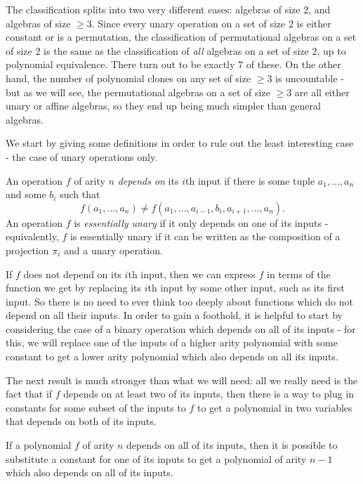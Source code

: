 \begin{appendices}
The classification splits into two very different cases: algebras of size $2$, and algebras of size $\ge 3$. Since every unary operation on a set of size $2$ is either constant or is a permutation, the classification of permutational algebras on a set of size $2$ is the same as the classification of \emph{all} algebras on a set of size $2$, up to polynomial equivalence. There turn out to be exactly $7$ of these. On the other hand, the number of polynomial clones on any set of size $\ge 3$ is uncountable \cite{uncountable-polynomial-clones} - but as we will see, the permutational algebras on a set of size $\ge 3$ are all either unary or affine algebras, so they end up being much simpler than general algebras.

We start by giving some definitions in order to rule out the least interesting case - the case of unary operations only.

\begin{defn} An operation $f$ of arity $n$ \emph{depends on} its $i$th input if there is some tuple $a_1, ..., a_n$ and some $b_i$ such that
\[
f(a_1, ..., a_n) \ne f(a_1, ..., a_{i-1}, b_i, a_{i+1}, ..., a_n).
\]
An operation $f$ is \emph{essentially unary} if it only depends on one of its inputs - equivalently, $f$ is essentially unary if it can be written as the composition of a projection $\pi_i$ and a unary operation.
\end{defn}

If $f$ does not depend on its $i$th input, then we can express $f$ in terms of the function we get by replacing its $i$th input by some other input, such as its first input. So there is no need to ever think too deeply about functions which do not depend on all their inputs. In order to gain a foothold, it is helpful to start by considering the case of a binary operation which depends on all of its inputs - for this, we will replace one of the inputs of a higher arity polynomial with some constant to get a lower arity polynomial which also depends on all its inputs.

The next result is much stronger than what we will need: all we really need is the fact that if $f$ depends on at least two of its inputs, then there is a way to plug in constants for some subset of the inputs to $f$ to get a polynomial in two variables that depends on both of its inputs.

\begin{prop}\label{prop-depend-inputs} If a polynomial $f$ of arity $n$ depends on all of its inputs, then it is possible to substitute a constant for one of its inputs to get a polynomial of arity $n-1$ which also depends on all of its inputs.


\end{prop}
\end{appendices}

